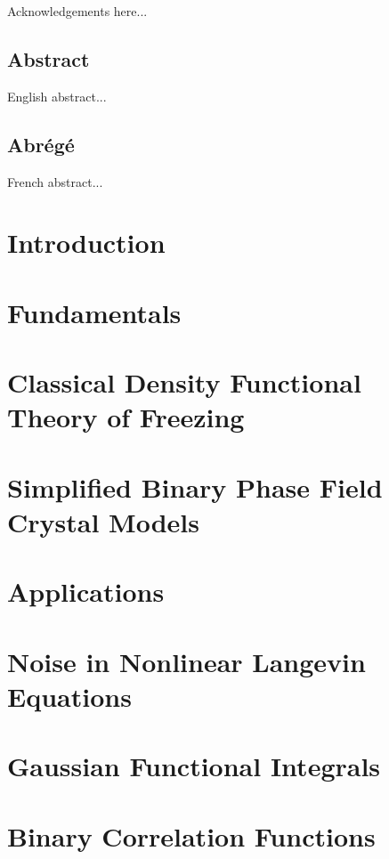 \documentclass[12pt, letterpaper]{report}
\begin{document}
Acknowledgements here...

\clearpage

\section*{Abstract}
\label{sec:abstract}

English abstract...

\clearpage

\section*{Abrégé}
\label{sec:abrege}

French abstract...

\clearpage

\tableofcontents 
\listoffigures
\listoftables


\chapter{Introduction}
\label{introduction}


\chapter{Fundamentals}
\label{fundamentals}


\chapter{Classical Density Functional Theory of Freezing}
\label{dft_of_freezing}


\chapter{Simplified Binary Phase Field Crystal Models}


\chapter{Applications}
%


\appendix

\chapter{Noise in Nonlinear Langevin Equations}
\label{noise}


\chapter{Gaussian Functional Integrals}


\chapter{Binary Correlation Functions}




\end{document}
